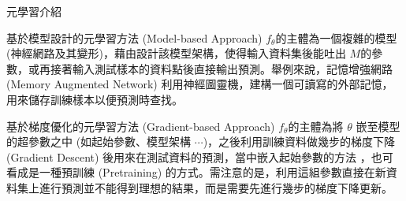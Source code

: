 \documentclass[12pt,UTF8,fntef]{article}
\begin{document}
\begin{section}{元學習介紹}
    \begin{subsection}{基於模型設計的元學習方法 (Model-based Approach)} \label{model-meta}
      $f_\theta$的主體為一個複雜的模型 (神經網路及其變形)，藉由設計該模型架構，使得輸入資料集後能吐出 $M$的參數，或再接著輸入測試樣本的資料點後直接輸出預測。舉例來說，記憶增強網路 (Memory Augmented Network) \cite{santoro2016meta}利用神經圖靈機，建構一個可讀寫的外部記憶，用來儲存訓練樣本以便預測時查找。
    \end{subsection}

    \begin{subsection}{基於梯度優化的元學習方法 (Gradient-based Approach)} \label{opt-meta}
      $f_\theta$的主體為將 $\theta$ 嵌至模型的超參數之中 (如起始參數、模型架構 $\cdots$)，之後利用訓練資料做幾步的梯度下降 (Gradient Descent) 後用來在測試資料的預測，當中嵌入起始參數的方法 \cite{finn2017model, nichol2018first}，也可看成是一種預訓練 (Pretraining) 的方式。需注意的是，利用這組參數直接在新資料集上進行預測並不能得到理想的結果，而是需要先進行幾步的梯度下降更新。
    \end{subsection}
  \end{section}
  \newpage
\end{document}
